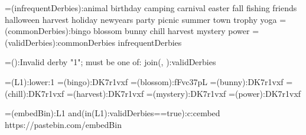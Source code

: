 {=(infrequentDerbies):animal birthday camping carnival easter fall fishing friends halloween harvest holiday newyears party picnic summer town trophy yoga}
{=(commonDerbies):bingo blossom bunny chill harvest mystery power}
{=(validDerbies):{commonDerbies} {infrequentDerbies}}

{=():Invalid derby "{1}"; must be one of: {join(, ):{validDerbies}}}

{=(L1):{lower:{1}}}
{=(bingo):DK7r1vxf}
{=(blossom):fFvc37pL}
{=(bunny):DK7r1vxf}
{=(chill):DK7r1vxf}
{=(harvest):DK7r1vxf}
{=(mystery):DK7r1vxf}
{=(power):DK7r1vxf}


{=(embedBin):{{L1}}}
{{and({in({L1}):{validDerbies}}==true):c:cembed https://pastebin.com/{embedBin}}}